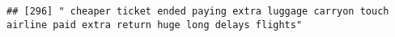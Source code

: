 \documentclass[
]{article}
\begin{document}
\begin{verbatim}
## [296] " cheaper ticket ended paying extra luggage carryon touch airline paid extra return huge long delays flights"                                                                                                                                                                                                                                                                                                                                                                                                                                                                                                                                                                                                                                                                                                                                                                                                                                                                                                                                                                                                                                                                                                                                                                                                                                                                                                                                                                                                                                                                                                                                                                                                                                                                                   

\end{verbatim}
\end{document}

